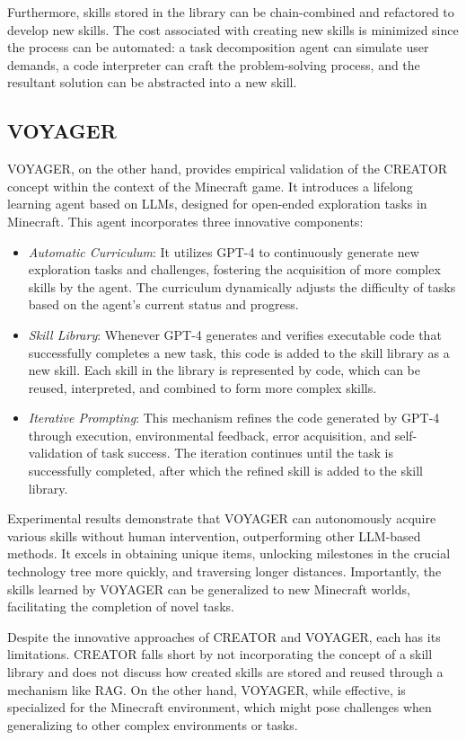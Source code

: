 Furthermore, skills stored in the library can be chain-combined and refactored to develop new skills. The cost associated with creating new skills is minimized since the process can be automated: a task decomposition agent can simulate user demands, a code interpreter can craft the problem-solving process, and the resultant solution can be abstracted into a new skill.

\subsection{VOYAGER}

VOYAGER, on the other hand, provides empirical validation of the CREATOR concept within the context of the Minecraft game.
It introduces a lifelong learning agent based on LLMs, designed for open-ended exploration tasks in Minecraft. This agent incorporates three innovative components:
\begin{itemize}
    \item \textit{Automatic Curriculum}: It utilizes GPT-4 to continuously generate new exploration tasks and challenges, fostering the acquisition of more complex skills by the agent. The curriculum dynamically adjusts the difficulty of tasks based on the agent’s current status and progress.
    \item \textit{Skill Library}: Whenever GPT-4 generates and verifies executable code that successfully completes a new task, this code is added to the skill library as a new skill. Each skill in the library is represented by code, which can be reused, interpreted, and combined to form more complex skills.
    \item \textit{Iterative Prompting}: This mechanism refines the code generated by GPT-4 through execution, environmental feedback, error acquisition, and self-validation of task success. The iteration continues until the task is successfully completed, after which the refined skill is added to the skill library.
\end{itemize}

Experimental results demonstrate that VOYAGER can autonomously acquire various skills without human intervention, outperforming other LLM-based methods. It excels in obtaining unique items, unlocking milestones in the crucial technology tree more quickly, and traversing longer distances. Importantly, the skills learned by VOYAGER can be generalized to new Minecraft worlds, facilitating the completion of novel tasks.

Despite the innovative approaches of CREATOR and VOYAGER, each has its limitations. CREATOR falls short by not incorporating the concept of a skill library and does not discuss how created skills are stored and reused through a mechanism like RAG. On the other hand, VOYAGER, while effective, is specialized for the Minecraft environment, which might pose challenges when generalizing to other complex environments or tasks.

